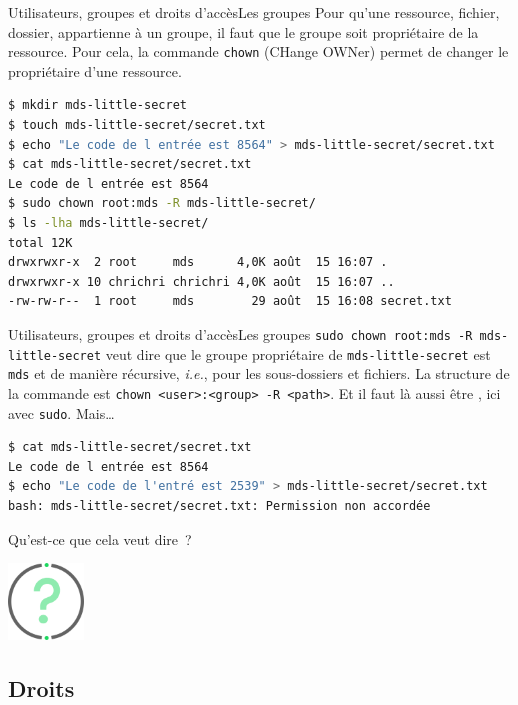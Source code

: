 \documentclass{beamer}
\begin{document}
    \begin{frame}[fragile]{Utilisateurs, groupes et droits d'accès}{Les groupes}
        Pour qu'une ressource, fichier, dossier, appartienne à un groupe, il faut que le groupe soit propriétaire de la ressource.
        Pour cela, la commande \lstinline{chown} (CHange OWNer) permet de changer le propriétaire d'une ressource.
        \begin{lstlisting}[language=bash,basicstyle=\tiny\ttfamily]
$ mkdir mds-little-secret
$ touch mds-little-secret/secret.txt
$ echo "Le code de l entrée est 8564" > mds-little-secret/secret.txt
$ cat mds-little-secret/secret.txt
Le code de l entrée est 8564
$ sudo chown root:mds -R mds-little-secret/
$ ls -lha mds-little-secret/
total 12K
drwxrwxr-x  2 root     mds      4,0K août  15 16:07 .
drwxrwxr-x 10 chrichri chrichri 4,0K août  15 16:07 ..
-rw-rw-r--  1 root     mds        29 août  15 16:08 secret.txt
        \end{lstlisting}
    \end{frame}

    \begin{frame}[fragile]{Utilisateurs, groupes et droits d'accès}{Les groupes}
        \lstinline{sudo chown root:mds -R mds-little-secret} veut dire que le groupe propriétaire de \lstinline{mds-little-secret} est \lstinline{mds} et de manière récursive, \textit{i.e.}, pour les sous-dossiers et fichiers.
        La structure de la commande est \lstinline{chown <user>:<group> -R <path>}.
        Et il faut là aussi être , ici avec \lstinline{sudo}.
        \bigbreak
        Mais\ldots
        \begin{lstlisting}[language=bash]
$ cat mds-little-secret/secret.txt
Le code de l entrée est 8564
$ echo "Le code de l'entré est 2539" > mds-little-secret/secret.txt
bash: mds-little-secret/secret.txt: Permission non accordée
        \end{lstlisting}
        Qu'est-ce que cela veut dire~?
        \begin{center}
            \includegraphics[width=2cm]{image/question-mark}
        \end{center}
    \end{frame}

    \subsection{Droits}\label{subsec:droits}
\end{document}
